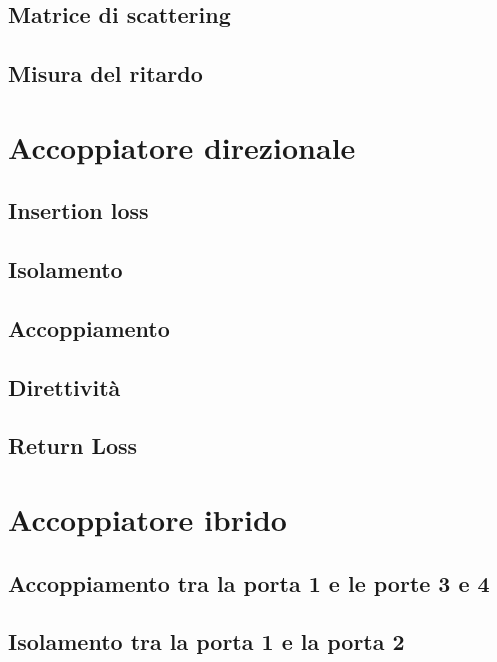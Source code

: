 \documentclass[11pt,a4paper,oneside]{book}
\begin{document}
\section{Matrice di scattering}

\section{Misura del ritardo}




\chapter{Accoppiatore direzionale}

\section{Insertion loss}

\section{Isolamento}

\section{Accoppiamento}

\section{Direttività}

\section{Return Loss}




\chapter{Accoppiatore ibrido}

\section{Accoppiamento tra la porta 1 e le porte 3 e 4}

\section{Isolamento tra la porta 1 e la porta 2}
\end{document}
